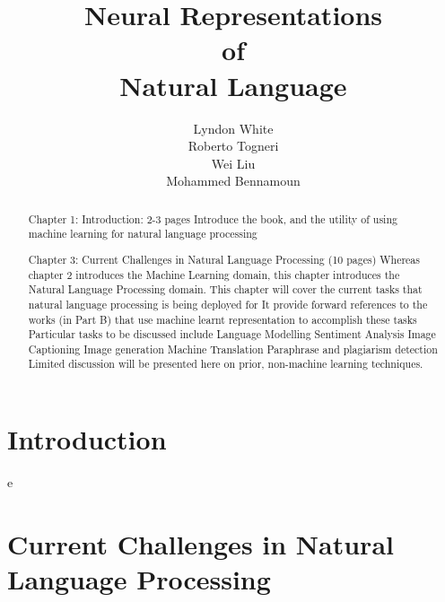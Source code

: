 \documentclass[12pt,parskip]{komatufte}
\begin{document}
\title{Neural Representations \\of\\ Natural Language}
\author{Lyndon White\\ Roberto Togneri\\ Wei Liu\\ Mohammed Bennamoun}
\publishers{SpringerBriefs in Computer Science}

\maketitle
\tableofcontents

\chapter{Introduction}\label{sec:introduction}
\begin{abstract}
	Chapter 1: Introduction: 2-3 pages
Introduce the book, and the utility of using machine learning for natural language processing
\end{abstract}


e


\chapter{Current Challenges in Natural Language Processing}\label{sec:current-challenges-in-natural-language-processing}
\begin{abstract}
	Chapter 3: Current Challenges in Natural Language Processing (10 pages)
	Whereas chapter 2 introduces the Machine Learning domain, this chapter introduces the Natural Language Processing domain.
	This chapter will cover the current tasks that natural language processing is being deployed for
	It provide forward references to the works (in Part B) that use machine learnt representation to accomplish these tasks
	Particular tasks to be discussed include
	Language Modelling
	Sentiment Analysis
	Image Captioning
	Image generation
	Machine Translation
	Paraphrase and plagiarism detection
	Limited discussion will be presented here on prior, non-machine learning techniques.
\end{abstract}
\end{document}
